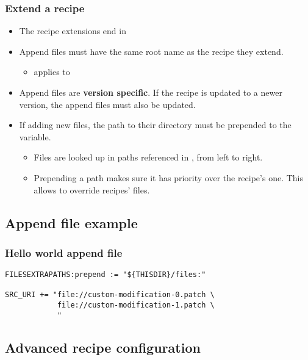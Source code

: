 \begin{frame}
  \frametitle{Extend a recipe}
  \begin{itemize}
    \item The recipe extensions end in 
    \item Append files must have the same root name as the recipe they
          extend.
    \begin{itemize}
      \item {} applies to
    \end{itemize}
    \item Append files are {\bf version specific}. If the recipe is
          updated to a newer version, the append files must also be
          updated.
    \item If adding new files, the path to their directory must
          be prepended to the  variable.
    \begin{itemize}
      \item Files are looked up in paths referenced in
            , from left to right.
      \item Prepending a path makes sure it has priority over the recipe's
            one. This allows to override recipes' files.
    \end{itemize}
  \end{itemize}
\end{frame}

\subsection{Append file example}

\begin{frame}[fragile]
  \frametitle{Hello world append file}
  \begin{block}{}
    \begin{verbatim}
FILESEXTRAPATHS:prepend := "${THISDIR}/files:"

SRC_URI += "file://custom-modification-0.patch \
            file://custom-modification-1.patch \
            "
    \end{verbatim}
  \end{block}
\end{frame}

\subsection{Advanced recipe configuration}

